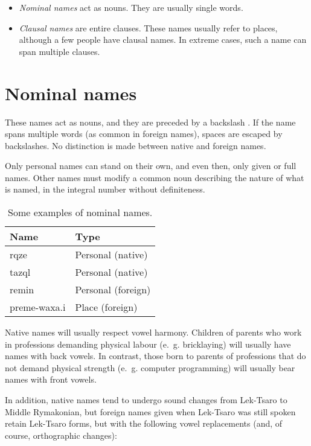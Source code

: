 \documentclass{book}
\newcommand{\lname}{Middle Rymakonian}
\begin{document}
\begin{itemize}
    \item \emph{Nominal names} act as nouns. They are usually single words.
    \item \emph{Clausal names} are entire clauses. These names usually refer to places, although a few people have clausal names. In extreme cases, such a name can span multiple clauses.
\end{itemize}

\section{Nominal names}

These names act as nouns, and they are preceded by a backslash \hortho{\bs}. If the name spans multiple words (as common in foreign names), spaces are escaped by backslashes. No distinction is made between native and foreign names.

Only personal names can stand on their own, and even then, only given or full names. Other names must modify a common noun describing the nature of what is named, in the integral number without definiteness.

\begin{table}[h]
    \centering
    \caption{Some examples of nominal names.}
    \label{table:names1}
    \begin{tabular}{>{\kardinal}ll}
        \textnormal{Name} & Type \\
        \hline
        \bs{}rqze & Personal (native) \\
        \bs{}tazql & Personal (native) \\
        \bs{}remin & Personal (foreign) \\
        preme-\bs{}waxa.i & Place (foreign) \\
    \end{tabular}
\end{table}

Native names will usually respect vowel harmony. Children of parents who work in professions demanding physical labour (e.~g. bricklaying) will usually have names with back vowels. In contrast, those born to parents of professions that do not demand physical strength (e.~g. computer programming) will usually bear names with front vowels.

In addition, native names tend to undergo sound changes from Lek-Tsaro to \lname, but foreign names given when Lek-Tsaro was still spoken retain Lek-Tsaro forms, but with the following vowel replacements (and, of course, orthographic changes):
\end{document}
